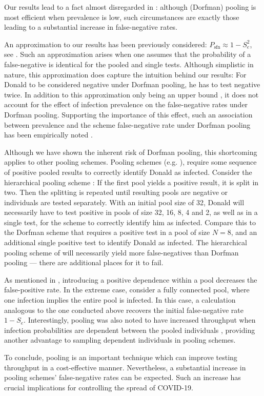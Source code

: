\documentclass{article}
\newcommand{\Se}{S_e}
\newcommand{\mi}{P_{\text{sfn}}}
\begin{document}
Our results lead to a fact almost disregarded in \cite{DorfmanYuvalDor}: although (Dorfman) pooling is most efficient when prevalence is low, such circumstances are exactly those leading to a substantial increase in false-negative rates. 

An approximation to our results has been previously considered: $\mi \approx 1-\Se^2 $, see \cite{Simplistic1, Simplistic2, Kim, OptimalDorfmanPool}. Such an approximation arises when one assumes that the probability of a false-negative is identical for the pooled and single tests. Although simplistic in nature, this approximation does capture the intuition behind our results: For Donald to be considered negative under Dorfman pooling, he has to test negative twice. In addition to this approximation only being an upper bound \cite{Simplistic2}, it does not account for the effect of infection prevalence on the false-negative rates under Dorfman pooling. Supporting the importance of this effect, such an association between prevalence and the scheme false-negative rate under Dorfman pooling has been empirically noted  \cite{DorfmanYuvalDor}.

Although we have shown the inherent risk of Dorfman pooling, this shortcoming applies to other pooling schemes. Pooling schemes (e.g. \cite{MatrixPooling,Lion, Kim}), require some sequence of positive pooled results to correctly identify Donald as infected. Consider the hierarchical pooling scheme \cite{Lion, Kim}: If the first pool yields a positive result, it is split in two. Then the splitting is repeated until resulting pools are negative or individuals are tested separately. With an initial pool size of 32, Donald will necessarily have to test positive in pools of size 32, 16, 8, 4 and 2, as well as in a single test, for the scheme to correctly identify him as infected. Compare this to the Dorfman scheme that requires a positive test in a pool of size $N=8$, and an additional single positive test to identify Donald as infected. The hierarchical pooling scheme of \cite{Lion, Kim} will necessarily yield  more false-negatives than Dorfman pooling --- there are additional places for it to fail.

As mentioned in \cite{DorfmanYuvalDor}, introducing a positive dependence within a pool decreases the false-positive rate. In the extreme case, consider a fully connected pool, where one infection implies the entire pool is infected. In this case, a calculation analogous to the one conducted above recovers the initial false-negative rate $1-\Se$. Interestingly, pooling was also noted to have increased throughput when infection probabilities are dependent between the pooled individuals \cite{DorfmanYuvalDor}, providing  another advantage to sampling dependent individuals in pooling schemes.  

To conclude, pooling is an important technique which can improve testing throughput in a cost-effective manner. Nevertheless, a substantial increase in pooling schemes' false-negative rates can be expected. Such an increase has crucial implications for controlling the spread of COVID-19.






\end{document}
